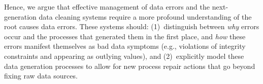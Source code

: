 Hence, we argue that effective management of data errors and the next-generation data cleaning systems require a more profound understanding of the root causes data errors. These systems should: (1)~distinguish between \emph{why} errors occur and the processes that generated them in the first place, and \emph{how}  these errors manifest themselves as bad data symptoms (e.g., violations of integrity constraints and appearing as outlying values), and (2)~explicitly model these data generation processes to allow for new process repair actions that go beyond fixing raw data sources. 

%



